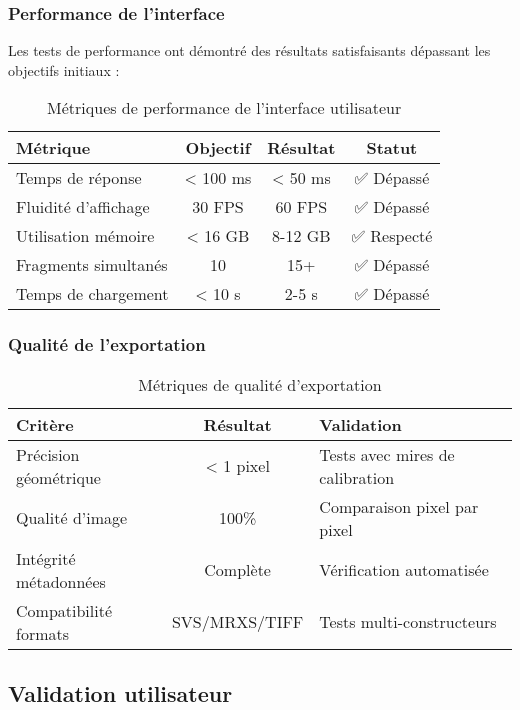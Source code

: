 \documentclass[12pt,a4paper]{report}
\begin{document}
\begin{}
\begin{}
\begin{}
\begin{}
\subsubsection{Performance de l'interface}

Les tests de performance ont démontré des résultats satisfaisants dépassant les objectifs initiaux :

\begin{table}[H]
\centering
\begin{tabular}{|l|c|c|c|}
\hline
\textbf{Métrique} & \textbf{Objectif} & \textbf{Résultat} & \textbf{Statut} \\
\hline
Temps de réponse & < 100 ms & < 50 ms & ✅ Dépassé \\
\hline
Fluidité d'affichage & 30 FPS & 60 FPS & ✅ Dépassé \\
\hline
Utilisation mémoire & < 16 GB & 8-12 GB & ✅ Respecté \\
\hline
Fragments simultanés & 10 & 15+ & ✅ Dépassé \\
\hline
Temps de chargement & < 10 s & 2-5 s & ✅ Dépassé \\
\hline
\end{tabular}
\caption{Métriques de performance de l'interface utilisateur}
\label{tab:performance_interface}
\end{table}

\subsubsection{Qualité de l'exportation}

\begin{table}[H]
\centering
\begin{tabular}{|l|c|l|}
\hline
\textbf{Critère} & \textbf{Résultat} & \textbf{Validation} \\
\hline
Précision géométrique & < 1 pixel & Tests avec mires de calibration \\
\hline
Qualité d'image & 100\% & Comparaison pixel par pixel \\
\hline
Intégrité métadonnées & Complète & Vérification automatisée \\
\hline
Compatibilité formats & SVS/MRXS/TIFF & Tests multi-constructeurs \\
\hline
\end{tabular}
\caption{Métriques de qualité d'exportation}
\label{tab:qualite_export}
\end{table}

\subsection{Validation utilisateur}


\end{}
\end{}
\end{}
\end{}
\end{document}
